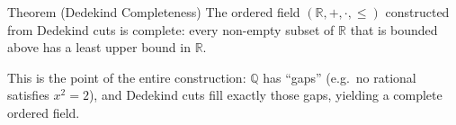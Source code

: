 \begin{theorembox}{Theorem (Dedekind Completeness)}
\label{thm:dedekind-complete}
The ordered field $(\mathbb{R}, +, \cdot, \leq)$ constructed from Dedekind cuts
is complete: every non-empty subset of $\mathbb{R}$ that is bounded above
has a least upper bound in $\mathbb{R}$.
\end{theorembox}

\begin{remark*}[Significance]
This is the point of the entire construction: $\mathbb{Q}$ has ``gaps''
(e.g.\ no rational satisfies $x^2 = 2$), and Dedekind cuts fill exactly
those gaps, yielding a complete ordered field.
\end{remark*}
